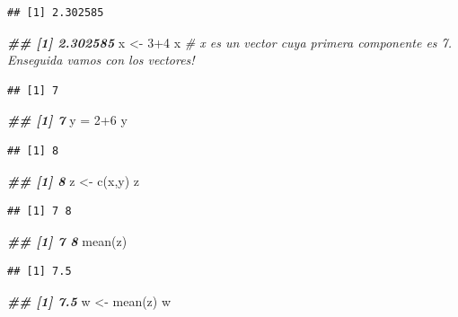 \documentclass[
]{book}
\newenvironment{Shaded}{\begin{snugshade}}{\end{snugshade}}
\newcommand{\CommentTok}[1]{\textcolor[rgb]{0.56,0.35,0.01}{\textit{#1}}}
\newcommand{\DecValTok}[1]{\textcolor[rgb]{0.00,0.00,0.81}{#1}}
\newcommand{\DocumentationTok}[1]{\textcolor[rgb]{0.56,0.35,0.01}{\textbf{\textit{#1}}}}
\newcommand{\FunctionTok}[1]{\textcolor[rgb]{0.00,0.00,0.00}{#1}}
\newcommand{\NormalTok}[1]{#1}
\newcommand{\OtherTok}[1]{\textcolor[rgb]{0.56,0.35,0.01}{#1}}
\newcommand{\SpecialCharTok}[1]{\textcolor[rgb]{0.00,0.00,0.00}{#1}}
\begin{document}
\begin{verbatim}
## [1] 2.302585
\end{verbatim}

\begin{Shaded}
\begin{Highlighting}[]
\DocumentationTok{\#\# [1] 2.302585}
\NormalTok{x }\OtherTok{\textless{}{-}} \DecValTok{3}\SpecialCharTok{+}\DecValTok{4}  
\NormalTok{x  }\CommentTok{\# x es un vector cuya primera componente es 7. Enseguida vamos con los vectores!}
\end{Highlighting}
\end{Shaded}

\begin{verbatim}
## [1] 7
\end{verbatim}

\begin{Shaded}
\begin{Highlighting}[]
\DocumentationTok{\#\# [1] 7}
\NormalTok{y }\OtherTok{=} \DecValTok{2}\SpecialCharTok{+}\DecValTok{6}
\NormalTok{y}
\end{Highlighting}
\end{Shaded}

\begin{verbatim}
## [1] 8
\end{verbatim}

\begin{Shaded}
\begin{Highlighting}[]
\DocumentationTok{\#\# [1] 8}
\NormalTok{z }\OtherTok{\textless{}{-}} \FunctionTok{c}\NormalTok{(x,y)}
\NormalTok{z}
\end{Highlighting}
\end{Shaded}

\begin{verbatim}
## [1] 7 8
\end{verbatim}

\begin{Shaded}
\begin{Highlighting}[]
\DocumentationTok{\#\# [1] 7 8}
\FunctionTok{mean}\NormalTok{(z)}
\end{Highlighting}
\end{Shaded}

\begin{verbatim}
## [1] 7.5
\end{verbatim}

\begin{Shaded}
\begin{Highlighting}[]
\DocumentationTok{\#\# [1] 7.5}
\NormalTok{w }\OtherTok{\textless{}{-}} \FunctionTok{mean}\NormalTok{(z)}
\NormalTok{w}
\end{Highlighting}
\end{Shaded}
\end{document}
